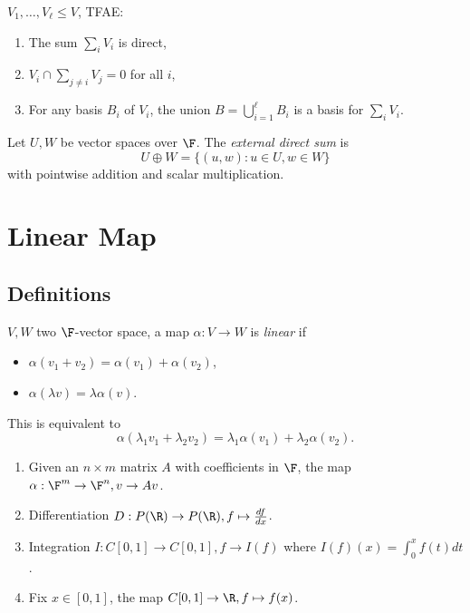 \documentclass[a4paper]{article}
\theoremstyle{definition}
\begin{document}
\begin{ex}
  \(V_1,\ldots, V_\ell \leq V\), TFAE:
  \begin{enumerate}
  \item The sum \(\sum_i V_i\) is direct,
  \item \(V_i \cap \sum_{j\neq i}V_j = 0\) for all \(i\),
  \item For any basis \(B_i\) of \(V_i\), the union \(B=\bigcup_{i=1}^\ell B_i\) is a basis for \(\sum_i V_i\).
  \end{enumerate}
\end{ex}

\begin{definition}
  Let \(U, W\) be vector spaces over \(\F\). The \emph{external direct sum} is
  \[
    U\oplus W = \{(u,w): u\in U, w\in W\}
  \]
  with pointwise addition and scalar multiplication.
\end{definition}

\section{Linear Map}

\subsection{Definitions}

\begin{definition}
  \(V, W\) two \(\F\)-vector space, a map \(\alpha: V\to W\) is \emph{linear} if
  \begin{itemize}
  \item \(\alpha(v_1 + v_2) = \alpha(v_1) + \alpha(v_2)\),
  \item \(\alpha(\lambda v) = \lambda \alpha(v)\).
  \end{itemize}
  This is equivalent to
  \[
\alpha(\lambda_1v_1+ \lambda_2v_2) = \lambda_1\alpha(v_1) + \lambda_2\alpha(v_2).
  \]
\end{definition}

\begin{eg}\leavevmode
  \begin{enumerate}
  \item Given an \(n\times m\) matrix \(A\) with coefficients in \(\F\), the map \(\alpha: \F^m\to \F^n, v\to Av\).
  \item Differentiation \(D: P(\R) \to P(\R), f\mapsto \frac{df}{dx}\).
  \item Integration \(I: C[0,1] \to C[0,1], f\to I(f)\) where \(I(f)(x) = \int_0^x f(t)dt\).
  \item Fix \(x\in [0,1]\), the map \(C[0,1]\to \R, f\mapsto f(x)\).
  \end{enumerate}
\end{eg}
\end{document}
